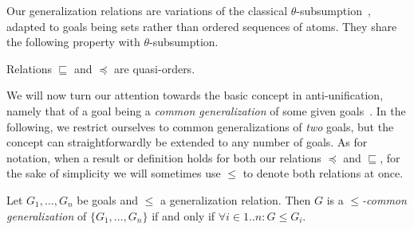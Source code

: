 Our generalization relations are variations of the classical $\theta$-subsumption~\cite{plotkin}, adapted to goals being sets rather than ordered sequences of atoms. They share the following property with $\theta$-subsumption.
\begin{proposition}\label{prop-quasi-order}
	Relations $\sqsubseteq$ and $\preceq$ are quasi-orders. 
\end{proposition}

We will now turn our attention towards the basic concept in anti-unification, namely that of a goal being a \textit{common generalization} of some given goals~\cite{plotkin}. In the following, we restrict ourselves to common generalizations of \textit{two} goals, but the concept can straightforwardly be extended to any number of goals. As for notation, when a result or definition holds for both our relations $\preceq$ and $\sqsubseteq$, for the sake of simplicity we will sometimes use $\leqslant$ to denote both relations at once. 

\begin{definition}%
	\label{def-common-generalization} 
	Let $G_1,\dots,G_n$ be goals and $\leqslant$ a generalization relation. Then $G$ is a \emph{$\leqslant$-common generalization} of $\{G_1,\dots,G_n\}$ if and only if $\forall i \in 1..n : G\leqslant G_i$.
\end{definition}

